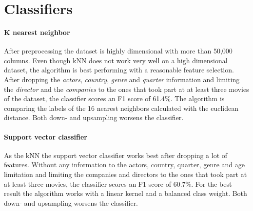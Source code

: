 
\section {Classifiers}
\paragraph{K nearest neighbor}
After preprocessing the dataset is highly dimensional with more than 50,000 columns. Even though kNN does not work very well on a high dimensional dataset, the algorithm is best performing with a reasonable feature selection. After dropping the \textit{actors}, \textit{country}, \textit{genre} and \textit{quarter} information and limiting the \textit{director} and the \textit{companies} to the ones that took part at at least three movies of the dataset, the classifier scores an F1 score of 61.4\%. The algorithm is comparing the labels of the 16 nearest neighbors calculated with the euclidean distance. Both down- and upsampling worsens the classifier. 

\paragraph{Support vector classifier}
As the kNN the support vector classifier works best after dropping a lot of features. Without any information to the actors, country, quarter, genre and age limitation and limiting the companies and directors to the ones that took part at at least three movies, the classifier scores an F1 score of 60.7\%. For the best result the algorithm works with a linear kernel and a balanced class weight. Both down- and upsampling worsens the classifier.

